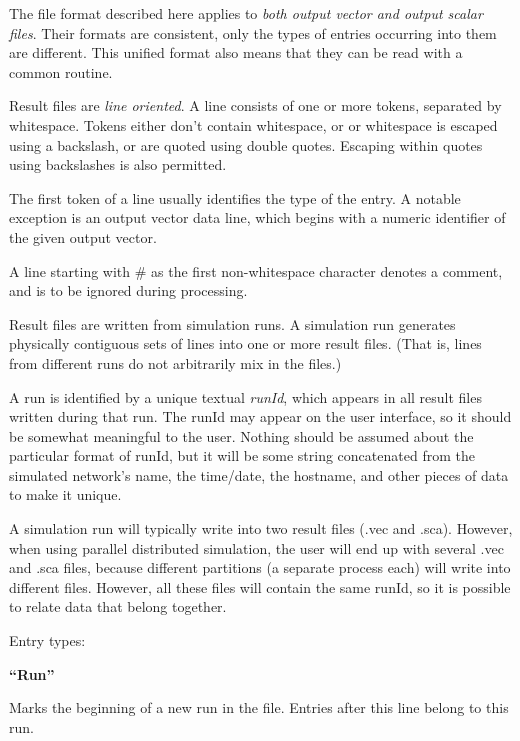 \label{cha:result-file-formats}

The file format described here applies to \textit{both output vector and
output scalar files}. Their formats are consistent, only the types of
entries occurring into them are different. This unified format also
means that they can be read with a common routine.

Result files are \textit{line oriented}. A line consists of one or more
tokens, separated by whitespace. Tokens either don't
contain whitespace, or or whitespace is escaped using a backslash, or
are quoted using double quotes. Escaping within quotes using
backslashes is also permitted.

The first token of a line usually identifies the type of the entry. A
notable exception is an output vector data line, which begins with a
numeric identifier of the given output vector.

A line starting with \# as the first non{}-whitespace character denotes
a comment, and is to be ignored during processing.

Result files are written from simulation runs. A simulation run
generates physically contiguous sets of lines into one or more result
files. (That is, lines from different runs do not arbitrarily mix in
the files.)


A run is identified by a unique textual\textit{ runId}, which appears in
all result files written during that run. The runId may appear on the
user interface, so it should be somewhat meaningful to the user.
Nothing should be assumed about the particular format of runId, but it
will be some string concatenated from the simulated network's name, the
time/date, the hostname, and other pieces of data to make it unique.


A simulation run will typically write into two result files (.vec and
.sca). However, when using parallel distributed simulation, the user
will end up with several .vec and .sca files, because different
partitions (a separate process each) will write into different files.
However, all these files will contain the same runId, so it is possible
to relate data that belong together.

\bigskip

Entry types:

{\bfseries
``Run''}

Marks the beginning of a new run in the file. Entries after this line
belong to this run.


\bigskip

